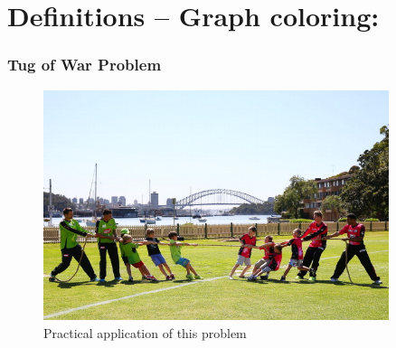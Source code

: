 \documentclass{beamer}
\begin{document}

\section{Definitions -- Graph coloring:}
\begin{frame}[fragile] 
	\frametitle{Tug of War Problem}
		
	
\begin{figure}[tbp]
  \centering
	 \includegraphics[width=0.9\textwidth , height=0.7\textheight] {tug-of-war.jpg}
  \caption{Practical application of this problem}
	
	\end{figure}

\end{frame}
\end{document}
